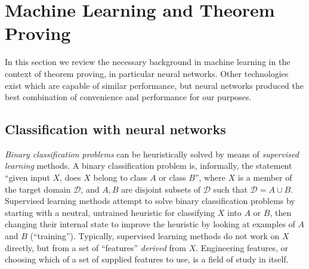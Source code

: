 \documentclass{llncs}
\begin{document}
\section{Machine Learning and Theorem Proving} \label{sec:ml}

In this section we review the necessary background in machine learning in the context of theorem proving, in particular neural networks.
Other technologies exist which are capable of similar performance, but neural networks produced the best combination of convenience and performance for our purposes.

\subsection{Classification with neural networks}
\emph{Binary classification problems} can be heuristically solved by means of \emph{supervised learning} methods.
A binary classification problem is, informally, the statement ``given input \(X\), does \(X\) belong to class \(A\) or class \(B\)'', where \(X\) is a member of the target domain \(\mathcal{D}\), and \(A, B\) are disjoint subsets of \(\mathcal{D}\) such that \(\mathcal{D} = A \cup B\).
Supervised learning methods attempt to solve binary classification problems by starting with a neutral, untrained heuristic for classifying \(X\) into \(A\) or \(B\), then changing their internal state to improve the heuristic by looking at examples of \(A\) and \(B\) (``training'').
Typically, supervised learning methods do not work on \(X\) directly, but from a set of ``features'' \emph{derived} from \(X\).
Engineering features, or choosing which of a set of supplied features to use, is a field of study in itself.
\end{document}
